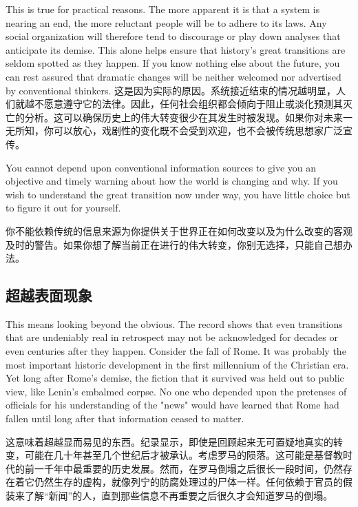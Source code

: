 \begin{Parallel}{97mm}{72mm}
  \ParallelLText
  {This is true for practical reasons. The more apparent it is that a system is nearing an end, the more reluctant people will be to adhere to its laws. Any social organization will therefore tend to discourage or play down analyses that anticipate its demise. This alone helps ensure that history's great transitions are seldom spotted as they happen. If you know nothing else about the future, you can rest assured that dramatic changes will be neither welcomed nor advertised by conventional thinkers.}
  \ParallelRText
  {这是因为实际的原因。系统接近结束的情况越明显，人们就越不愿意遵守它的法律。因此，任何社会组织都会倾向于阻止或淡化预测其灭亡的分析。这可以确保历史上的伟大转变很少在其发生时被发现。如果你对未来一无所知，你可以放心，戏剧性的变化既不会受到欢迎，也不会被传统思想家广泛宣传。}

  \ParallelPar  

  \ParallelLText
  {You cannot depend upon conventional information sources to give you an objective and timely warning about how the world is changing and why. If you wish to understand the great transition now under way, you have little choice but to figure it out for yourself. }
  
  \ParallelRText
  {你不能依赖传统的信息来源为你提供关于世界正在如何改变以及为什么改变的客观及时的警告。如果你想了解当前正在进行的伟大转变，你别无选择，只能自己想办法。}

  \ParallelPar  

  \subsection{超越表面现象}

  \ParallelLText
  {This means looking beyond the obvious. The record shows that even transitions that are undeniably real in retrospect may not be acknowledged for decades or even centuries after they happen. Consider the fall of Rome. It was probably the most important historic development in the first millennium of the Christian era. Yet long after Rome's demise, the fiction that it survived was held out to public view, like Lenin's embalmed corpse. No one who depended upon the pretenses of officials for his understanding of the "news" would have learned that Rome had fallen until long after that information ceased to matter.} 

  \ParallelRText
  {这意味着超越显而易见的东西。纪录显示，即使是回顾起来无可置疑地真实的转变，可能在几十年甚至几个世纪后才被承认。考虑罗马的陨落。这可能是基督教时代的前一千年中最重要的历史发展。然而，在罗马倒塌之后很长一段时间，仍然存在着它仍然生存的虚构，就像列宁的防腐处理过的尸体一样。任何依赖于官员的假装来了解“新闻”的人，直到那些信息不再重要之后很久才会知道罗马的倒塌。}
  \ParallelPar


\end{Parallel}
